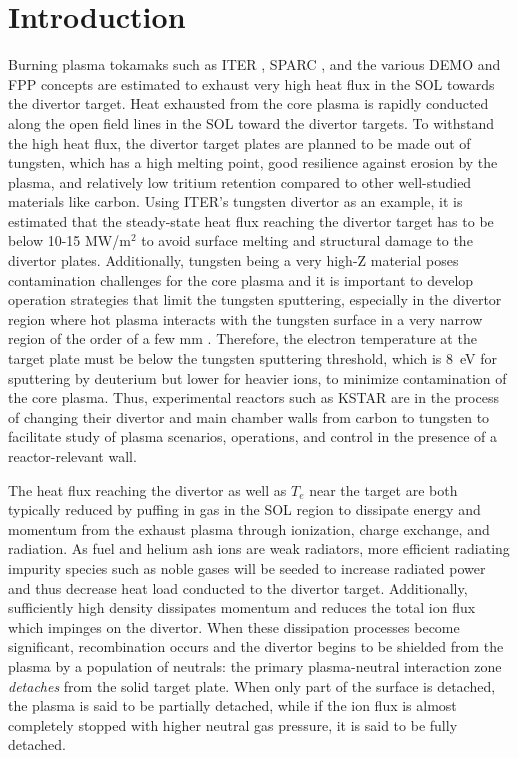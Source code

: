 \documentclass[10pt]{iopart}
\begin{document}

\section{Introduction}
\label{sec:introduction}

Burning plasma tokamaks such as ITER \cite{Holtkamp_2007_FED}, SPARC \cite{Creely_2020_JPP}, and the various DEMO \cite{Federici_2014_FED} and \ac{FPP} \cite{Buttery_2021_NF} concepts are estimated to exhaust very high heat flux in the \ac{SOL} towards the divertor target.
Heat exhausted from the core plasma is rapidly conducted along the open field lines in the \ac{SOL} toward the divertor targets.
To withstand the high heat flux, the divertor target plates are planned to be made out of tungsten, which has a high melting point, good resilience against erosion by the plasma, and relatively low tritium retention compared to other well-studied materials like carbon.
Using ITER's tungsten divertor as an example, it is estimated that the steady-state heat flux reaching the divertor target has to be below 10-15 MW/m$^2$ \cite{Pitts_2019_NME} to avoid surface melting and structural damage to the divertor plates.
Additionally, tungsten being a very high-Z material poses contamination challenges for the core plasma and it is important to develop operation strategies that limit the tungsten sputtering, especially in the divertor region where hot plasma interacts with the tungsten surface in a very narrow region of the order of a few mm \cite{Eich_2013_NF}.
Therefore, the electron temperature at the target plate must be below the tungsten sputtering threshold, which is 8~eV \cite{Brezinsek_2019_NF} for sputtering by deuterium but lower for heavier ions, to minimize contamination of the core plasma.
Thus, experimental reactors such as KSTAR are in the process of changing their divertor and main chamber walls from carbon to tungsten to facilitate study of plasma scenarios, operations, and control in the presence of a reactor-relevant wall.

The heat flux reaching the divertor as well as $T_e$ near the target are both typically reduced by puffing in gas in the \ac{SOL} region to dissipate energy and momentum from the exhaust plasma through ionization, charge exchange, and radiation.
As fuel and helium ash ions are weak radiators, more efficient radiating impurity species such as noble gases will be seeded to increase radiated power and thus decrease heat load conducted to the divertor target.
Additionally, sufficiently high density dissipates momentum and reduces the total ion flux which impinges on the divertor.
When these dissipation processes become significant, recombination occurs and the divertor begins to be shielded from the plasma by a population of neutrals: the primary plasma-neutral interaction zone \emph{detaches} from the solid target plate.
When only part of the surface is detached, the plasma is said to be partially detached, while if the ion flux is almost completely stopped with higher neutral gas pressure, it is said to be fully detached.
\end{document}
